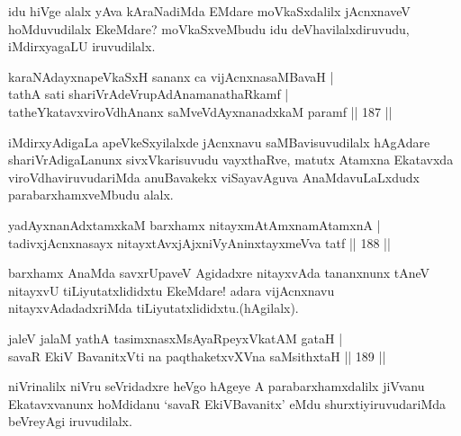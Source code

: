 \begin{artha}
idu hiVge alalx yAva kAraNadiMda EMdare moVkaSxdalilx jAcnxnaveV hoMduvudilalx EkeMdare? moVkaSxveMbudu idu deVhavilalxdiruvudu, iMdirxyagaLU iruvudilalx. 
\end{artha}

\begin{shl}
karaNAdayxnapeVkaSxH sananx ca vijAcnxnasaMBavaH |\\
tathA sati shariVrAdeVrupAdAnamanathaRkamf |\\
tatheYkatavxviroVdhAnanx saMveVdAyxnanadxkaM paramf \hfill || 187 ||
\end{shl}

\begin{artha}
iMdirxyAdigaLa apeVkeSxyilalxde jAcnxnavu saMBavisuvudilalx hAgAdare shariVrAdigaLanunx sivxVkarisuvudu vayxthaRve, matutx Atamxna Ekatavxda viroVdhaviruvudariMda anuBavakekx viSayavAguva AnaMdavuLaLxdudx parabarxhamxveMbudu alalx.
\end{artha}%


\begin{shl}
yadAyxnanAdxtamxkaM barxhamx nitayxmAtAmxnamAtamxnA |\\
tadivxjAcnxnasayx nitayxtAvxjAjxniVyAninxtayxmeVva tatf \hfill || 188 ||
\end{shl}

\begin{artha}
barxhamx AnaMda savxrUpaveV Agidadxre nitayxvAda tananxnunx tAneV nitayxvU tiLiyutatxlididxtu EkeMdare! adara vijAcnxnavu nitayxvAdadadxriMda tiLiyutatxlididxtu.(hAgilalx).
\end{artha}


\begin{shl}
jaleV jalaM yathA tasimxnasxMsAyaRpeyxVkatAM gataH |\\
savaR EkiV BavanitxVti na paqthaketxvXVna saMsithxtaH \hfill || 189 ||
\end{shl}

\begin{artha}
niVrinalilx niVru seVridadxre heVgo hAgeye A parabarxhamxdalilx jiVvanu Ekatavxvanunx hoMdidanu `savaR EkiVBavanitx' eMdu shurxtiyiruvudariMda beVreyAgi iruvudilalx.
\end{artha}


